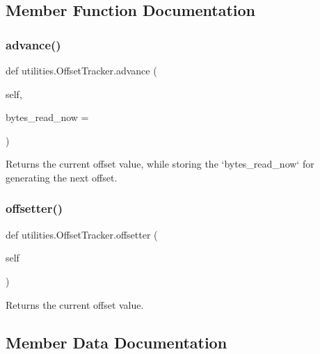 \subsection{Member Function Documentation}
\mbox{\label{classutilities_1_1OffsetTracker_a058ad5ae0b53bfbfecc4612e094951d5}} 
\subsubsection{\texorpdfstring{advance()}{advance()}}
{\footnotesize\ttfamily def utilities.\+Offset\+Tracker.\+advance (\begin{DoxyParamCaption}\item[{}]{self,  }\item[{}]{bytes\+\_\+read\+\_\+now = {} }\end{DoxyParamCaption})}

\begin{DoxyVerb}Returns the current offset value, while storing the 
`bytes_read_now` for generating the next offset.
\end{DoxyVerb}
 \mbox{\label{classutilities_1_1OffsetTracker_a3ed692ec6058294066507626026b78f1}} 
\subsubsection{\texorpdfstring{offsetter()}{offsetter()}}
{\footnotesize\ttfamily def utilities.\+Offset\+Tracker.\+offsetter (\begin{DoxyParamCaption}\item[{}]{self }\end{DoxyParamCaption})}

\begin{DoxyVerb}Returns the current offset value.
\end{DoxyVerb}
 

\subsection{Member Data Documentation}
\mbox{\label{classutilities_1_1OffsetTracker_aa316b20e9e769ec032e38d902846f279}} 
